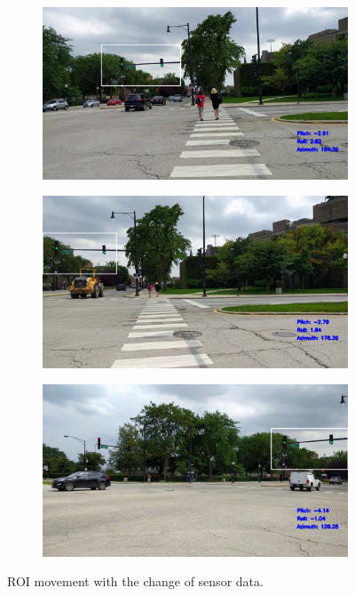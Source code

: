 \begin{figure}[!ht]
  \centering
  \begin {subfigure}
    \centering
    \includegraphics[width=4.2in]{images/rec_mv.jpg}
  \end{subfigure}

  \begin{subfigure}
    \centering
    \includegraphics[width=4.2in]{images/rec_mv1.jpg}
  \end{subfigure}

  \begin{subfigure}
    \centering
    \includegraphics[width=4.2in]{images/rec_mv2.jpg}
  \end{subfigure}
  
\caption{ROI movement with the change of sensor data.}
\label{f:rec_mv}
\end{figure}

